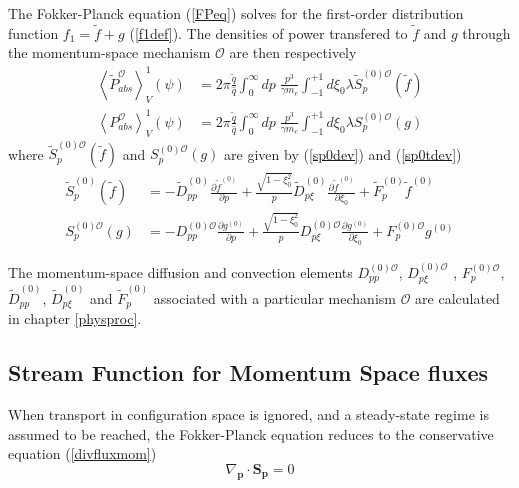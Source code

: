 The Fokker-Planck equation (\ref{FPeq}) solves for the first-order
distribution function $f_{1}=\widetilde{f}+g$ (\ref{f1def}). The densities
of power transfered to $\widetilde{f}$ and $g$ through the momentum-space
mechanism $\mathcal{O}$ are then respectively
\begin{align}
\left\langle \widetilde{P}_{abs}^{\mathcal{O}}\right\rangle _{V}^{1}\left(
\psi\right) & =2\pi\frac{\widetilde{q}}{\widehat{q}}\int_{0}^{\infty }dp\;%
\frac{p^{3}}{\gamma m_{e}}\int_{-1}^{+1}d\xi_{0}\lambda\widetilde{S}
_{p}^{\left( 0\right) \mathcal{O}}\left( \widetilde{f}\right)  \label{pabs1t}
\\
\left\langle P_{abs}^{\mathcal{O}}\right\rangle _{V}^{1}\left( \psi\right) &
=2\pi\frac{\widetilde{q}}{\widehat{q}}\int_{0}^{\infty}dp\;\frac{p^{3}}{
\gamma m_{e}}\int_{-1}^{+1}d\xi_{0}\lambda S_{p}^{\left( 0\right) \mathcal{O}
}\left( g\right)  \label{pabs1g}
\end{align}
where $\widetilde{S}_{p}^{\left( 0\right) \mathcal{O}}\left( \widetilde
{f}\right) $ and $S_{p}^{\left( 0\right) \mathcal{O}}\left( g\right) $ are
given by (\ref{sp0dev}) and (\ref{sp0tdev})
\begin{align}
\widetilde{S}_{p}^{(0)}\left( \widetilde{f}\right) & =-\widetilde{D}
_{pp}^{(0)}\frac{\partial\widetilde{f}^{(0)}}{\partial p}+\frac{\sqrt
{1-\xi_{0}^{2}}}{p}\widetilde{D}_{p\xi}^{(0)}\frac{\partial\widetilde{f}
^{(0)}}{\partial\xi_{0}}+\widetilde{F}_{p}^{(0)}\widetilde{f}^{(0)} \\
S_{p}^{(0)\mathcal{O}}\left( g\right) & =-D_{pp}^{(0)\mathcal{O}}\frac{
\partial g^{(0)}}{\partial p}+\frac{\sqrt{1-\xi_{0}^{2}}}{p}D_{p\xi }^{(0)%
\mathcal{O}}\frac{\partial g^{(0)}}{\partial\xi_{0}}+F_{p}^{(0)\mathcal{O}
}g^{(0)}
\end{align}

The momentum-space diffusion and convection elements $D_{pp}^{(0)\mathcal{O}
} $, $D_{p\xi}^{(0)\mathcal{O}}$ , $F_{p}^{(0)\mathcal{O}}$, $\widetilde{D}
_{pp}^{(0)}$, $\widetilde{D}_{p\xi}^{(0)}$ and $\widetilde{F}_{p}^{(0)}$
associated with a particular mechanism $\mathcal{O}$ are calculated in
chapter \ref{physproc}.

\subsection{Stream Function for Momentum Space fluxes}

When transport in configuration space is ignored, and a steady-state regime
is assumed to be reached, the Fokker-Planck equation reduces to the
conservative equation (\ref{divfluxmom})
\begin{equation}
\nabla_{\mathbf{p}}\cdot\mathbf{S}_{\mathbf{p}}=0
\end{equation}

